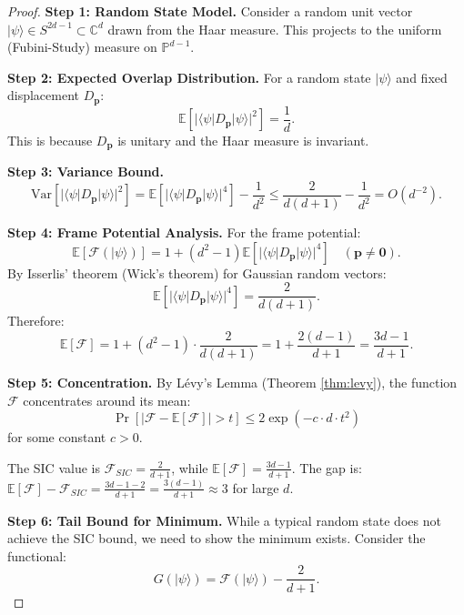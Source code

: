 \documentclass[a4paper,11pt]{article}
\newcommand{\C}{\mathbb{C}}
\newcommand{\PP}{\mathbb{P}}
\begin{document}
\begin{proof}
\textbf{Step 1: Random State Model.}
Consider a random unit vector $|\psi\rangle \in S^{2d-1} \subset \C^d$ drawn from the Haar measure. This projects to the uniform (Fubini-Study) measure on $\PP^{d-1}$.

\textbf{Step 2: Expected Overlap Distribution.}
For a random state $|\psi\rangle$ and fixed displacement $D_\mathbf{p}$:
\begin{equation}
\mathbb{E}[|\langle\psi|D_\mathbf{p}|\psi\rangle|^2] = \frac{1}{d}.
\end{equation}
This is because $D_\mathbf{p}$ is unitary and the Haar measure is invariant.

\textbf{Step 3: Variance Bound.}
\begin{equation}
\text{Var}[|\langle\psi|D_\mathbf{p}|\psi\rangle|^2] = \mathbb{E}[|\langle\psi|D_\mathbf{p}|\psi\rangle|^4] - \frac{1}{d^2} \leq \frac{2}{d(d+1)} - \frac{1}{d^2} = O(d^{-2}).
\end{equation}

\textbf{Step 4: Frame Potential Analysis.}
For the frame potential:
\begin{equation}
\mathbb{E}[\mathcal{F}(|\psi\rangle)] = 1 + (d^2-1)\mathbb{E}[|\langle\psi|D_\mathbf{p}|\psi\rangle|^4] \quad (\mathbf{p} \neq \mathbf{0}).
\end{equation}
By Isserlis' theorem (Wick's theorem) for Gaussian random vectors:
\begin{equation}
\mathbb{E}[|\langle\psi|D_\mathbf{p}|\psi\rangle|^4] = \frac{2}{d(d+1)}.
\end{equation}
Therefore:
\begin{equation}
\mathbb{E}[\mathcal{F}] = 1 + (d^2-1) \cdot \frac{2}{d(d+1)} = 1 + \frac{2(d-1)}{d+1} = \frac{3d-1}{d+1}.
\end{equation}

\textbf{Step 5: Concentration.}
By Lévy's Lemma (Theorem \ref{thm:levy}), the function $\mathcal{F}$ concentrates around its mean:
\begin{equation}
\Pr\left[|\mathcal{F} - \mathbb{E}[\mathcal{F}]| > t\right] \leq 2\exp(-c \cdot d \cdot t^2)
\end{equation}
for some constant $c > 0$.

The SIC value is $\mathcal{F}_{SIC} = \frac{2}{d+1}$, while $\mathbb{E}[\mathcal{F}] = \frac{3d-1}{d+1}$.
The gap is: $\mathbb{E}[\mathcal{F}] - \mathcal{F}_{SIC} = \frac{3d-1-2}{d+1} = \frac{3(d-1)}{d+1} \approx 3$ for large $d$.

\textbf{Step 6: Tail Bound for Minimum.}
While a typical random state does not achieve the SIC bound, we need to show the minimum exists. Consider the functional:
\begin{equation}
G(|\psi\rangle) = \mathcal{F}(|\psi\rangle) - \frac{2}{d+1}.
\end{equation}


\end{proof}
\end{document}
